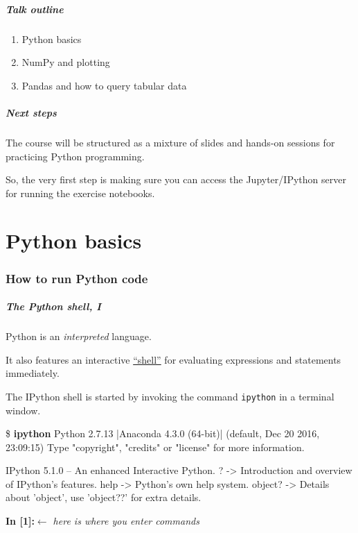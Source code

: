 \documentclass[english,serif,mathserif,xcolor=pdftex,dvipsnames,table]{beamer}
\begin{document}
\begin{frame}
  \frametitle{Talk outline}
  \begin{enumerate}
  \item Python basics
  \item NumPy and plotting
  \item Pandas and how to query tabular data
  \end{enumerate}
\end{frame}


\begin{frame}
  \frametitle{Next steps}

  The course will be structured as a mixture of slides and hands-on
  sessions for practicing Python programming.

  \+
  So, the very first step is making sure you can access the Jupyter/IPython
  server for running the exercise notebooks.
\end{frame}


\part{Python basics}

\section{How to run Python code}

\begin{frame}[fragile]
  \frametitle{The Python shell, I}
  Python is an \emph{interpreted} language.

  \+
  It also features an interactive
  \href{http://en.wikipedia.org/wiki/REPL}{``shell''} for evaluating
  expressions and statements immediately.

  \+
  The IPython shell is started by invoking the command
  \texttt{ipython} in a terminal window.
\begin{semiverbatim}\tiny
\$ \textbf{ipython}
Python 2.7.13 |Anaconda 4.3.0 (64-bit)| (default, Dec 20 2016, 23:09:15)
Type "copyright", "credits" or "license" for more information.

IPython 5.1.0 -- An enhanced Interactive Python.
?         -> Introduction and overview of IPython's features.
help      -> Python's own help system.
object?   -> Details about 'object', use 'object??' for extra details.

\textbf{In [1]:}{\color{blue}\normalfont\em \(\leftarrow\) here is where you enter commands}
\end{semiverbatim}
\end{frame}
\end{document}
